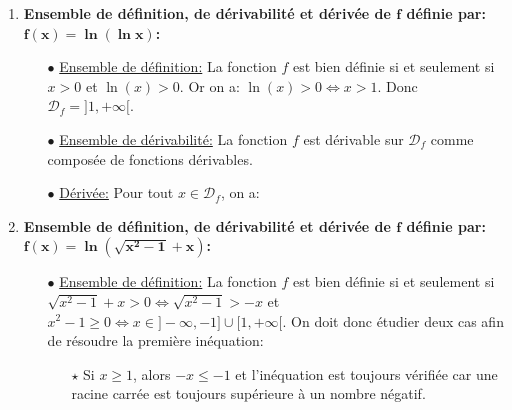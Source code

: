 \begin{correction}
\begin{enumerate}
\begin{itemize}
\item[$\bullet$] \underline{Ensemble de d\'efinition:} La fonction $f$ est bien d\'efinie si et seulement si $x>0$, $\ln{x}\geq 0$ et $x\not= 0$. La deuxi\`{e}me condition donne: $\ln{x}\geq 0\Leftrightarrow x\geq 1$. Donc $\mathcal{D}_f=\lbrack 1,+\infty\lbrack$.
\item[$\bullet$] \underline{Ensemble de d\'erivabilit\'e:} La fonction $f$ est d\'erivable sur $\rbrack 1,+\infty\lbrack$ car on doit avoir $\ln{x}>0$ comme compos\'ee et quotient de fonctions d\'erivables.
\item[$\bullet$] \underline{D\'eriv\'ee:} Pour tout $x\in\mathcal{D}_f$, on a: 
 \end{itemize}
 \item  \textbf{Ensemble de d\'efinition, de d\'erivabilit\'e et d\'eriv\'ee de $\mathbf{f}$ d\'efinie par: $\mathbf{f(x)=\ln{(\ln{x})}}$:}
\begin{itemize}
\item[$\bullet$] \underline{Ensemble de d\'efinition:} La fonction $f$ est bien d\'efinie si et seulement si $x>0$ et $\ln{(x)}>0$. Or on a: $\ln{(x)}>0\Leftrightarrow x>1$. Donc $\mathcal{D}_f=\rbrack 1,+\infty\lbrack$.
\item[$\bullet$] \underline{Ensemble de d\'erivabilit\'e:} La fonction $f$ est d\'erivable sur $\mathcal{D}_f$ comme compos\'ee de fonctions d\'erivables. 
\item[$\bullet$] \underline{D\'eriv\'ee:} Pour tout $x\in\mathcal{D}_f$, on a: 
 \end{itemize}
\item  \textbf{Ensemble de d\'efinition, de d\'erivabilit\'e et d\'eriv\'ee de $\mathbf{f}$ d\'efinie par: $\mathbf{f(x)=\ln{(\sqrt{x^2-1}+x)}}$:}
\begin{itemize}
\item[$\bullet$] \underline{Ensemble de d\'efinition:} La fonction $f$ est bien d\'efinie si et seulement si $\sqrt{x^2-1}+x>0\Leftrightarrow \sqrt{x^2-1}>-x$ et $x^2-1\geq 0\Leftrightarrow x\in\rbrack -\infty,-1\rbrack\cup\lbrack 1,+\infty\lbrack$. On doit donc \'etudier deux cas afin de r\'esoudre la premi\`{e}re in\'equation:
\begin{itemize}
\item[$\star$] Si $x\geq 1$, alors $-x\leq -1$ et l'in\'equation est toujours v\'erifi\'ee car une racine carr\'ee est toujours sup\'erieure \`{a} un nombre n\'egatif.

\end{itemize}
\end{itemize}
\end{enumerate}
\end{correction}
